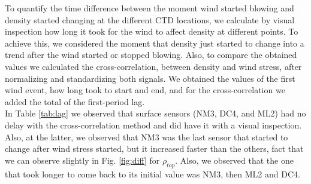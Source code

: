 \documentclass[tesis.tex]{subfiles}
\begin{document}
To quantify the time difference between the moment wind started blowing and density started changing at the different CTD locations, we calculate by visual inspection how long it took for the wind to affect density at different points. To achieve this, we considered the moment that density just started to change into a trend after the wind started or stopped blowing. Also, to compare the obtained values we calculated the cross-correlation, between density and wind stress, after normalizing and standardizing both signals. We obtained the values of the first wind event, how long took to start and end, and for the cross-correlation we added the total of the first-period lag.\\

In Table \ref{tab:lag} we observed that surface sensors (NM3, DC4, and ML2) had no delay with the cross-correlation method and did have it with a visual inspection. Also, at the latter, we observed that NM3 was the last sensor that started to change after wind stress started, but it increased faster than the others, fact that we can observe slightly in Fig. \ref{fig:diff} for $\rho_{top}$. Also, we observed that the one that took longer to come back to its initial value was NM3, then ML2 and DC4.\\
\end{document}

